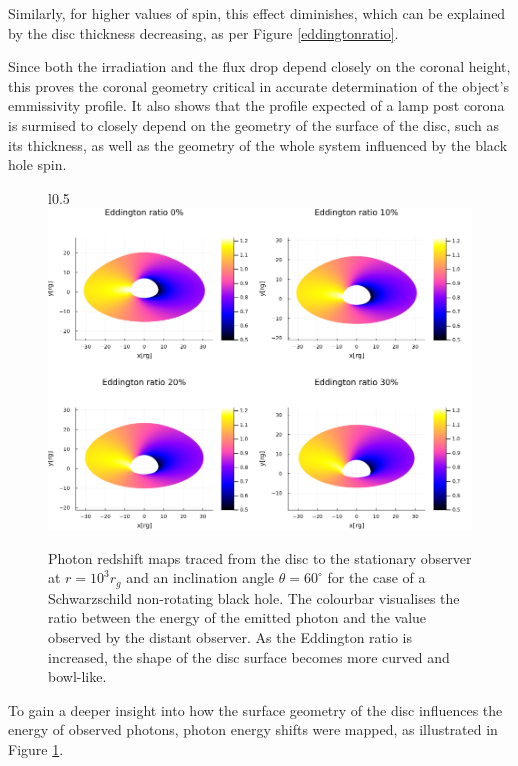 \documentclass[fleqn,usenatbib,useAMS]{mnras}
\begin{document}
Similarly, for higher values of spin, this effect diminishes, which can be explained by the disc thickness decreasing, as per Figure \ref{eddingtonratio}. 

Since both the irradiation and the flux drop depend closely on the coronal height, this proves the coronal geometry critical in accurate determination of the object's emmissivity profile. It also shows that the profile expected of a lamp post corona is surmised to closely depend on the geometry of the surface of the disc, such as its thickness, as well as the geometry of the whole system influenced by the black hole spin.

\newpage

\begin{figure}{l}{0.5\textwidth}
\includegraphics[width=\linewidth]{figures/redshift.png}
\caption{Photon redshift maps traced from the disc to the stationary observer at $r = 10^{3} r_{g}$ and an inclination angle $\theta = 60^{\circ}$ for the case of a Schwarzschild non-rotating black hole. The colourbar visualises the ratio between the energy of the emitted photon and the value observed by the distant observer. As the Eddington ratio is increased, the shape of the disc surface becomes more curved and bowl-like.}
\label{redshift}
\end{figure}

To gain a deeper insight into how the surface geometry of the disc influences the energy of observed photons, photon energy shifts were mapped, as illustrated in Figure \ref{redshift}.
\end{document}
